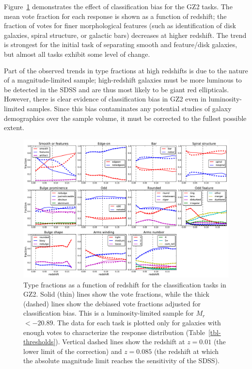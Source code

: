 \documentclass[useAMS,usenatbib]{mn2e}
\newcommand{\mr}{$M_r$}
\begin{document}
Figure~\ref{fig-type_fractions} demonstrates the effect of classification bias for the GZ2 tasks. The mean vote fraction for each response is shown as a function of redshift; the fraction of votes for finer morphological features (such as identification of disk galaxies, spiral structure, or galactic bars) decreases at higher redshift. The trend is strongest for the initial task of separating smooth and feature/disk galaxies, but almost all tasks exhibit some level of change. 

Part of the observed trends in type fractions at high redshifts is due to the nature of a magnitude-limited sample; high-redshift galaxies must be more luminous to be detected in the SDSS and are thus most likely to be giant red ellipticals. However, there is clear evidence of classification bias in GZ2 even in luminosity-limited samples. Since this bias contaminates any potential studies of galaxy demographics over the sample volume, it must be corrected to the fullest possible extent. 

\begin{figure}
\includegraphics[angle=0,width=7.0in]{figures/gz2_type_fractions.pdf}
\caption{Type fractions as a function of redshift for the classification tasks in GZ2. Solid (thin) lines show the vote fractions, while the thick (dashed) lines show the debiased vote fractions adjusted for classification bias. This is a luminosity-limited sample for \mr~$<-20.89$. The data for each task is plotted only for galaxies with enough votes to characterize the response distribution (Table~\ref{tbl-thresholds}). Vertical dashed lines show the redshift at $z=0.01$ (the lower limit of the correction) and $z=0.085$ (the redshift at which the absolute magnitude limit reaches the sensitivity of the SDSS). 
\label{fig-type_fractions}}
\end{figure}
\end{document}
